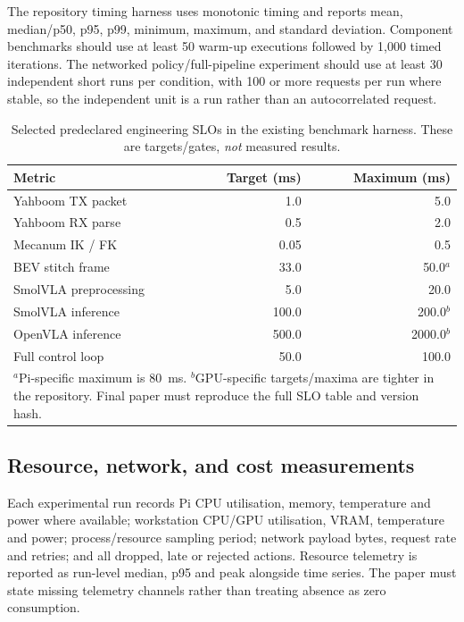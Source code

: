 \documentclass[letterpaper,10pt,conference]{ieeeconf}
\begin{document}
The repository timing harness uses monotonic timing and reports mean, median/p50, p95, p99, minimum, maximum, and standard deviation. Component benchmarks should use at least 50 warm-up executions followed by 1,000 timed iterations. The networked policy/full-pipeline experiment should use at least 30 independent short runs per condition, with 100 or more requests per run where stable, so the independent unit is a run rather than an autocorrelated request.

\begin{table}[t]
\caption{Selected predeclared engineering SLOs in the existing benchmark harness. These are targets/gates, \emph{not} measured results.}
\label{tab:slos}
\centering
\small
\begin{tabular}{lrr}
\toprule
Metric & Target (ms) & Maximum (ms) \\
\midrule
Yahboom TX packet & 1.0 & 5.0 \\
Yahboom RX parse & 0.5 & 2.0 \\
Mecanum IK / FK & 0.05 & 0.5 \\
BEV stitch frame & 33.0 & 50.0$^{a}$ \\
SmolVLA preprocessing & 5.0 & 20.0 \\
SmolVLA inference & 100.0 & 200.0$^{b}$ \\
OpenVLA inference & 500.0 & 2000.0$^{b}$ \\
Full control loop & 50.0 & 100.0 \\
\bottomrule
\multicolumn{3}{p{0.94\columnwidth}}{\footnotesize $^{a}$Pi-specific maximum is 80~ms. $^{b}$GPU-specific targets/maxima are tighter in the repository. Final paper must reproduce the full SLO table and version hash.}
\end{tabular}
\end{table}

\subsection{Resource, network, and cost measurements}

Each experimental run records Pi CPU utilisation, memory, temperature and power where available; workstation CPU/GPU utilisation, VRAM, temperature and power; process/resource sampling period; network payload bytes, request rate and retries; and all dropped, late or rejected actions. Resource telemetry is reported as run-level median, p95 and peak alongside time series. The paper must state missing telemetry channels rather than treating absence as zero consumption.
\end{document}
